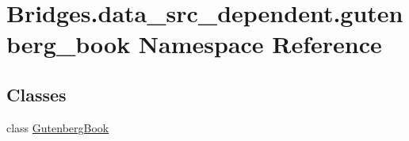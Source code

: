 \hypertarget{namespace_bridges_1_1data__src__dependent_1_1gutenberg__book}{}\section{Bridges.\+data\+\_\+src\+\_\+dependent.\+gutenberg\+\_\+book Namespace Reference}
\label{namespace_bridges_1_1data__src__dependent_1_1gutenberg__book}
\subsection*{Classes}
\begin{DoxyCompactItemize}
\item 
class \hyperlink{class_bridges_1_1data__src__dependent_1_1gutenberg__book_1_1_gutenberg_book}{Gutenberg\+Book}
\end{DoxyCompactItemize}
